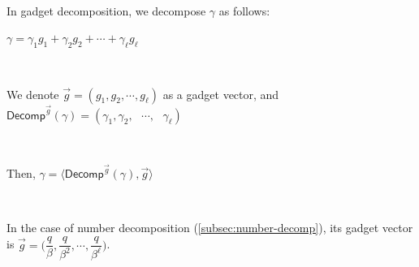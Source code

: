 $ $

In gadget decomposition, we decompose $\gamma$ as follows: 

$\gamma = \gamma_1 g_1 + \gamma_2 g_2 + \cdots + \gamma_\ell g_\ell $

$ $

We denote $\vec{g} = (g_1, g_2, \cdots, g_\ell)$ as a gadget vector, and $\textsf{Decomp}^{\vec{g}}(\gamma) = (\gamma_1, \gamma_2, \text{ } \cdots , \text{ } \gamma_\ell) $

$ $

Then, $\gamma = \langle \textsf{Decomp}^{\vec{g}}(\gamma), \vec{g} \rangle $

$ $

In the case of number decomposition (\autoref{subsec:number-decomp}), its gadget vector is $\vec{g} = \Bigg(\dfrac{q}{\beta}, \dfrac{q}{\beta^2}, \cdots, \dfrac{q}{\beta^\ell}\Bigg)$.